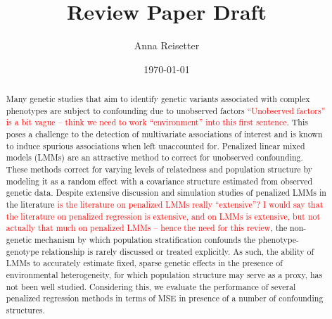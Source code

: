 \documentclass[a4paper]{article}
\title{Review Paper Draft}
\author{Anna Reisetter}
\date{\today}
\providecommand{\pb}[1]{\textcolor{red}{#1}}
\begin{document}
\maketitle

\begin{abstract}
Many genetic studies that aim to identify genetic variants associated with complex phenotypes are subject to confounding due to unobserved factors \pb{``Unobserved factors'' is a bit vague -- think we need to work ``environment'' into this first sentence}. This poses a challenge to the detection of multivariate associations of interest and is known to induce spurious associations when left unaccounted for. Penalized linear mixed models (LMMs) are an attractive method to correct for unobserved confounding. These methods correct for varying levels of relatedness and population structure by modeling it as a random effect with a covariance structure estimated from observed genetic data. Despite extensive discussion and simulation studies of penalized LMMs in the literature \pb{is the literature on penalized LMMs really ``extensive''?  I would say that the literature on penalized regression is extensive, and on LMMs is extensive, but not actually that much on penalized LMMs -- hence the need for this review}, the non-genetic mechanism by which population stratification confounds the phenotype-genotype relationship is rarely discussed or treated explicitly. As such, the ability of LMMs to accurately estimate fixed, sparse genetic effects in the presence of environmental heterogeneity, for which population structure may serve as a proxy, has not been well studied. Considering this, we evaluate the performance of several penalized regression methods in terms of MSE in presence of a number of confounding structures.
\end{abstract}



\newpage



\end{document}
